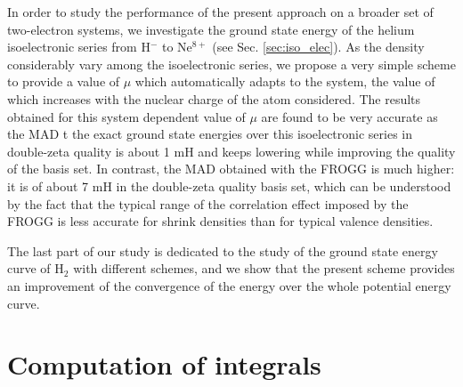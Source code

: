 \documentclass[aip,jcp,reprint,noshowkeys,superscriptaddress]{revtex4-1}
\begin{document}
In order to study the performance of the present approach on a broader set of two-electron systems, we investigate the ground state energy of the helium isoelectronic series from H$^-$ to Ne$^{8+}$ (see Sec. \ref{sec:iso_elec}). 
As the density considerably vary among the isoelectronic series, we propose a very simple scheme to provide a value of $\mu$ which automatically adapts to the system, the value of which increases with the nuclear charge of the atom considered. The results obtained for this system dependent value of $\mu$ are found to be very accurate as the MAD t the exact ground state energies over this isoelectronic series in double-zeta quality is about 1 mH and keeps lowering while improving the quality of the basis set. In contrast, the MAD obtained with the FROGG is much higher: it is of about 7 mH in the double-zeta quality basis set, which can be understood by the fact that the typical range of the correlation effect imposed by the FROGG is less accurate for shrink densities than for typical valence densities.  

The last part of our study is dedicated to the study of the ground state energy curve of H$_2$ with different schemes, and we show that the present scheme provides an improvement of the convergence of the energy over the whole potential energy curve. 



\section{Computation of integrals}
\end{document}
